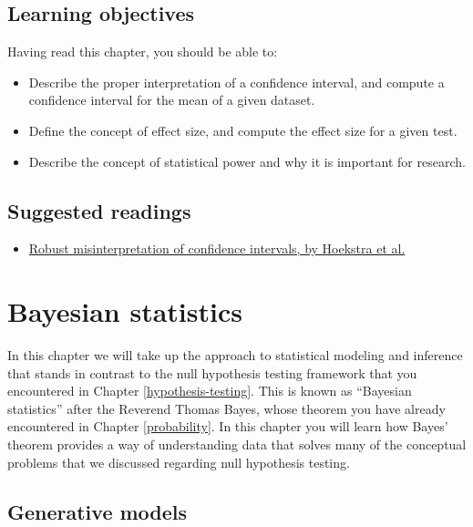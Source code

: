 \documentclass[12pt,]{book}
\providecommand{\tightlist}{%
  \setlength{\itemsep}{0pt}\setlength{\parskip}{0pt}}
\theoremstyle{definition}
\theoremstyle{definition}
\theoremstyle{definition}
\theoremstyle{remark}
\begin{document}
\hypertarget{learning-objectives-9}{%
\section{Learning objectives}\label{learning-objectives-9}}

Having read this chapter, you should be able to:

\begin{itemize}
\tightlist
\item
  Describe the proper interpretation of a confidence interval, and compute a confidence interval for the mean of a given dataset.
\item
  Define the concept of effect size, and compute the effect size for a given test.
\item
  Describe the concept of statistical power and why it is important for research.
\end{itemize}

\hypertarget{suggested-readings-7}{%
\section{Suggested readings}\label{suggested-readings-7}}

\begin{itemize}
\tightlist
\item
  \href{http://www.ejwagenmakers.com/inpress/HoekstraEtAlPBR.pdf}{Robust misinterpretation of confidence intervals, by Hoekstra et al.}
\end{itemize}

\hypertarget{bayesian-statistics}{%
\chapter{Bayesian statistics}\label{bayesian-statistics}}

In this chapter we will take up the approach to statistical modeling and inference that stands in contrast to the null hypothesis testing framework that you encountered in Chapter \ref{hypothesis-testing}. This is known as ``Bayesian statistics'' after the Reverend Thomas Bayes, whose theorem you have already encountered in Chapter \ref{probability}. In this chapter you will learn how Bayes' theorem provides a way of understanding data that solves many of the conceptual problems that we discussed regarding null hypothesis testing.

\hypertarget{generative-models}{%
\section{Generative models}\label{generative-models}}
\end{document}

